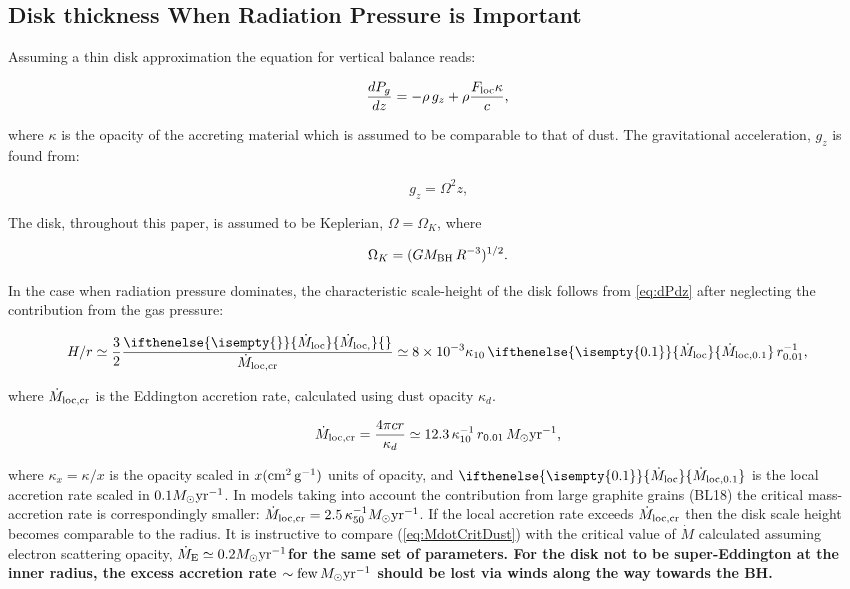\documentclass[12pt,english,preprint]{aastex}
\newcommand{\mybf}{\bf}
\newcommand{\su}[2]{#1_{\rm #2}}
\newcommand{\mdt}[1][]{ 
  \ifthenelse{\isempty{#1}}
  {\dot{M}_{\rm loc}}
  { {\dot M}_{\rm{loc},{#1}} } 
  } %
\newcommand{\mdtcr}{\su{\dot{M}}{loc,cr} }
\newcommand{\MsolYrM}{ \,M_{\odot}{\rm yr}^{-1} }
\begin{document}
\subsection{Disk thickness When Radiation Pressure is Important}

Assuming a thin disk
approximation the equation for vertical balance reads:

\begin{equation}
\frac{dP_g}{dz}=-\rho\,g_{z} + \rho\frac{\su{F}{loc}\kappa}{c}\mbox{,}\label{eq:dPdz}
\end{equation}

\noindent where $\kappa$ is the opacity of the accreting material which
is assumed to be comparable to that of dust.  The gravitational 
acceleration, $g_{z}$ is found from:

\begin{equation}
g_{z}=\Omega^{2}z\mbox{,}\label{eq:gz}
\end{equation}

\noindent The disk, throughout this paper, is assumed to be Keplerian, $\Omega=\Omega_{K}$, where

\begin{equation}
\Omega_{K}=(G\su{M}{BH}\,R^{-3})^{1/2}\mbox{.}\label{eq:OmegaKepler}
\end{equation}


In the case when  
radiation pressure dominates, the characteristic scale-height of the disk follows from \eqref{eq:dPdz} after neglecting the contribution from the gas
pressure: 

\begin{equation}
H/r\simeq\frac{3}{2}\frac{\mdt{}}{\mdtcr}
\simeq8\times10^{-3}\kappa_{10}\,\mdt[0.1]\,r_{0.01}^{-1}\mbox{,}\label{eq:H2R_rad}
\end{equation}

\noindent where $\mdtcr$ is the Eddington accretion rate, calculated using 
dust opacity $\kappa_{d}$. 

\begin{equation}
\mdtcr=\frac{4\pi cr}{\kappa_{d}}\simeq12.3\,\kappa_{10}^{-1}
\,r_{0.01}\,M_{\odot}{\rm yr}^{-1}\mbox{,}\label{eq:MdotCritDust}
\end{equation}

\noindent where $\kappa_x=\kappa/x$ is the opacity scaled in $x({\rm cm^2\,g^{-1}})$ units of opacity, 
and $\mdt[0.1]$ is the local accretion rate scaled
in $0.1 M_{\odot}{\rm yr}^{-1}$. In 
models taking into account the contribution from large graphite grains (BL18) 
the critical mass-accretion rate is correspondingly smaller:
$\mdtcr = 2.5\,\kappa_{50}^{-1} M_{\odot}{\rm yr}^{-1}$. If the local accretion rate exceeds $\mdtcr$ then the disk scale height becomes comparable to the radius.
It is instructive to compare (\ref{eq:MdotCritDust})
with the critical value of $\dot{M}$ calculated assuming electron scattering
opacity, $\dot{M}_{\text{E}}\simeq 0.2M_{\odot}{\rm yr}^{-1}${\mybf for the same set of 
parameters. For the disk not to be super-Eddington at the inner radius, the excess
accretion rate $\sim {\rm few}\MsolYrM$ should be lost via winds along the way towards the BH.}
\end{document}
